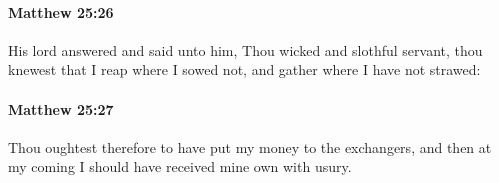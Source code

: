 		\paragraph{Matthew 25:26} %
			\label{MATTHEW-25-26}

			His lord answered and said unto him, Thou wicked and slothful servant, thou knewest that I reap where I sowed not, and gather where I have not strawed:

			\begin{framed}
			\scriptsize
				\begin{compactdesc}
					\item[SBLG] 
				\end{compactdesc}
			\end{framed}

		\paragraph{Matthew 25:27} %
			\label{MATTHEW-25-27}

			Thou oughtest therefore to have put my money to the exchangers, and then at my coming I should have received mine own with usury.

